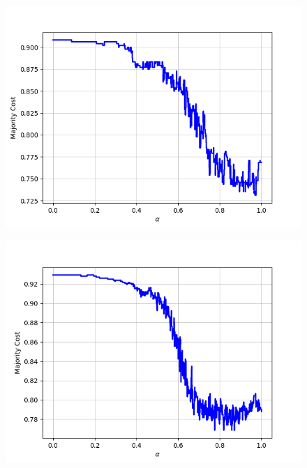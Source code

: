 \begin{figure}[H]
\begin{minipage}{.24\textwidth}
  {\includegraphics[width=\linewidth]{plots/omniglot-intra-sc/Asomtavruli_(Georgian)}}
\end{minipage}
\begin{minipage}{.24\textwidth}
  \centering
  {\includegraphics[width=\linewidth]{plots/omniglot-intra-sc/Balinese}}
\end{minipage}
\begin{minipage}{.24\textwidth}
  \centering

\end{minipage}
\end{figure}
